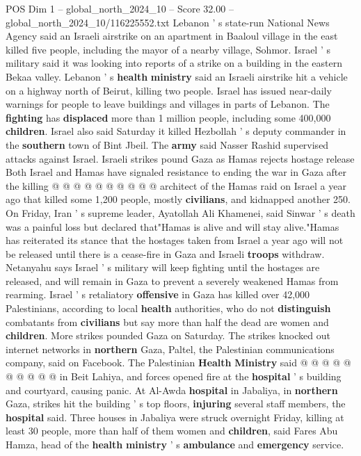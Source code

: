 \begin{textsample}{POS Dim 1 – global\_north\_2024\_10 – Score 32.00 – global\_north\_2024\_10/116225552.txt}
Lebanon ' s state-run National News Agency said an Israeli airstrike on an apartment in Baaloul village in the east killed five people, including the mayor of a nearby village, Sohmor.
Israel ' s military said it was looking into reports of a strike on a building in the eastern Bekaa valley.
Lebanon ' s \textbf{health} \textbf{ministry} said an Israeli airstrike hit a vehicle on a highway north of Beirut, killing two people.
Israel has issued near-daily warnings for people to leave buildings and villages in parts of Lebanon.
The \textbf{fighting} has \textbf{displaced} more than 1 million people, including some 400,000 \textbf{children}.
Israel also said Saturday it killed Hezbollah ' s deputy commander in the \textbf{southern} town of Bint Jbeil.
The \textbf{army} said Nasser Rashid supervised attacks against Israel.
Israeli strikes pound Gaza as Hamas rejects hostage release Both Israel and Hamas have signaled resistance to ending the war in Gaza after the killing @ @ @ @ @ @ @ @ @ @ architect of the Hamas raid on Israel a year ago that killed some 1,200 people, mostly \textbf{civilians}, and kidnapped another 250.
On Friday, Iran ' s supreme leader, Ayatollah Ali Khamenei, said Sinwar ' s death was a painful loss but declared that"Hamas is alive and will stay alive."Hamas has reiterated its stance that the hostages taken from Israel a year ago will not be released until there is a cease-fire in Gaza and Israeli \textbf{troops} withdraw.
Netanyahu says Israel ' s military will keep fighting until the hostages are released, and will remain in Gaza to prevent a severely weakened Hamas from rearming.
Israel ' s retaliatory \textbf{offensive} in Gaza has killed over 42,000 Palestinians, according to local \textbf{health} authorities, who do not \textbf{distinguish} combatants from \textbf{civilians} but say more than half the dead are women and \textbf{children}.
More strikes pounded Gaza on Saturday.
The strikes knocked out internet networks in \textbf{northern} Gaza, Paltel, the Palestinian communications company, said on Facebook.
The Palestinian \textbf{Health} \textbf{Ministry} said @ @ @ @ @ @ @ @ @ @ in Beit Lahiya, and forces opened fire at the \textbf{hospital} ' s building and courtyard, causing panic.
At Al-Awda \textbf{hospital} in Jabaliya, in \textbf{northern} Gaza, strikes hit the building ' s top floors, \textbf{injuring} several staff members, the \textbf{hospital} said.
Three houses in Jabaliya were struck overnight Friday, killing at least 30 people, more than half of them women and \textbf{children}, said Fares Abu Hamza, head of the \textbf{health} \textbf{ministry} ' s \textbf{ambulance} and \textbf{emergency} service.

\end{textsample}
